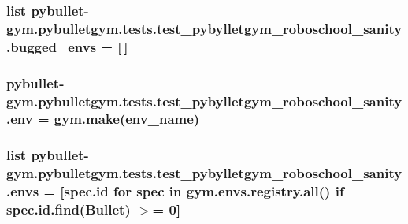 \subsubsection[{\texorpdfstring{bugged\+\_\+envs}{bugged_envs}}]{\setlength{\rightskip}{0pt plus 5cm}list pybullet-\/gym.\+pybulletgym.\+tests.\+test\+\_\+pybylletgym\+\_\+roboschool\+\_\+sanity.\+bugged\+\_\+envs = \mbox{[}$\,$\mbox{]}}\hypertarget{namespacepybullet-gym_1_1pybulletgym_1_1tests_1_1test__pybylletgym__roboschool__sanity_a9efadcae7097bab774f273e0318b2a03}{}\label{namespacepybullet-gym_1_1pybulletgym_1_1tests_1_1test__pybylletgym__roboschool__sanity_a9efadcae7097bab774f273e0318b2a03}
\subsubsection[{\texorpdfstring{env}{env}}]{\setlength{\rightskip}{0pt plus 5cm}pybullet-\/gym.\+pybulletgym.\+tests.\+test\+\_\+pybylletgym\+\_\+roboschool\+\_\+sanity.\+env = gym.\+make(env\+\_\+name)}\hypertarget{namespacepybullet-gym_1_1pybulletgym_1_1tests_1_1test__pybylletgym__roboschool__sanity_a2cedb6f36ab872b84786c5f13090e017}{}\label{namespacepybullet-gym_1_1pybulletgym_1_1tests_1_1test__pybylletgym__roboschool__sanity_a2cedb6f36ab872b84786c5f13090e017}
\subsubsection[{\texorpdfstring{envs}{envs}}]{\setlength{\rightskip}{0pt plus 5cm}list pybullet-\/gym.\+pybulletgym.\+tests.\+test\+\_\+pybylletgym\+\_\+roboschool\+\_\+sanity.\+envs = \mbox{[}spec.\+id for spec in gym.\+envs.\+registry.\+all() if spec.\+id.\+find(\textquotesingle{}Bullet\textquotesingle{}) $>$= 0\mbox{]}}\hypertarget{namespacepybullet-gym_1_1pybulletgym_1_1tests_1_1test__pybylletgym__roboschool__sanity_abc92f2e085bda30f9b8cf033fee2835b}{}\label{namespacepybullet-gym_1_1pybulletgym_1_1tests_1_1test__pybylletgym__roboschool__sanity_abc92f2e085bda30f9b8cf033fee2835b}
